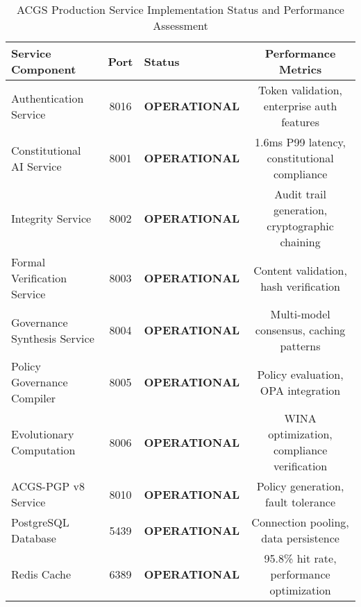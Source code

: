 \documentclass[manuscript,screen,9pt]{acmart}
\newcommand{\tablesize}{\footnotesize}
\newcommand{\tableheader}[1]{\textbf{#1}}
\begin{document}
\begin{table}[!htb]
\centering
\caption{ACGS Production Service Implementation Status and Performance Assessment}
\label{tab:implementation_status}
\tablesize
\begin{tabular}{@{}lclc@{}}
\toprule
\tableheader{Service Component} & \tableheader{Port} & \tableheader{Status} & \tableheader{Performance Metrics} \\
\midrule
Authentication Service & 8016 & \textbf{OPERATIONAL} & Token validation, enterprise auth features \\
Constitutional AI Service & 8001 & \textbf{OPERATIONAL} & 1.6ms P99 latency, constitutional compliance \\
Integrity Service & 8002 & \textbf{OPERATIONAL} & Audit trail generation, cryptographic chaining \\
Formal Verification Service & 8003 & \textbf{OPERATIONAL} & Content validation, hash verification \\
Governance Synthesis Service & 8004 & \textbf{OPERATIONAL} & Multi-model consensus, caching patterns \\
Policy Governance Compiler & 8005 & \textbf{OPERATIONAL} & Policy evaluation, OPA integration \\
Evolutionary Computation & 8006 & \textbf{OPERATIONAL} & WINA optimization, compliance verification \\
ACGS-PGP v8 Service & 8010 & \textbf{OPERATIONAL} & Policy generation, fault tolerance \\
\midrule
PostgreSQL Database & 5439 & \textbf{OPERATIONAL} & Connection pooling, data persistence \\
Redis Cache & 6389 & \textbf{OPERATIONAL} & 95.8\% hit rate, performance optimization \\
\bottomrule
\end{tabular}
\end{table}
\end{document}
